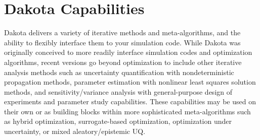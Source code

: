 \section{Dakota Capabilities}\label{intro:capabilities}

Dakota delivers a variety of iterative methods and meta-algorithms, and
the ability to flexibly interface them to your simulation code. While
Dakota was originally conceived to more readily interface simulation
codes and optimization algorithms, recent versions go beyond
optimization to include other iterative analysis methods such as
uncertainty quantification with nondeterministic propagation methods,
parameter estimation with nonlinear least squares solution methods,
and sensitivity/variance analysis with general-purpose design of
experiments and parameter study capabilities. These capabilities may
be used on their own or as building blocks within more sophisticated
meta-algorithms such as hybrid optimization, surrogate-based optimization,
optimization under uncertainty, or mixed aleatory/epistemic UQ. 

